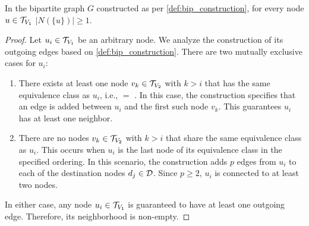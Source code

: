 \begin{claim} \label{claim:node_connectivity}
    In the bipartite graph $G$ constructed as per \cref{def:bip_construction}, for every node $u \in \mathcal{T}_{V_1}$  $|N(\{u\})| \geq 1$.
\end{claim}
\begin{proof}
    Let $u_i \in \mathcal{T}_{V_1}$ be an arbitrary node. We analyze the construction of its outgoing edges based on \cref{def:bip_construction}. There are two mutually exclusive cases for $u_i$:
    \begin{enumerate}
        \item There exists at least one node $v_k \in \mathcal{T}_{V_2}$ with $k > i$ that has the same equivalence class as $u_i$, i.e.,  $=$ . In this case, the construction specifies that an edge is added between $u_i$ and the first such node $v_k$. This guarantees $u_i$ has at least one neighbor.
        \item There are no nodes $v_k \in \mathcal{T}_{V_2}$ with $k > i$ that share the same equivalence class as $u_i$. This occurs when $u_i$ is the last node of its equivalence class in the specified ordering. In this scenario, the construction adds $p$ edges from $u_i$ to each of the destination nodes $d_j \in \mathcal{D}$. Since $p \geq 2$, $u_i$ is connected to at least two nodes.
    \end{enumerate}
    In either case, any node $u_i \in \mathcal{T}_{V_1}$ is guaranteed to have at least one outgoing edge. Therefore, its neighborhood is non-empty.
\end{proof}

